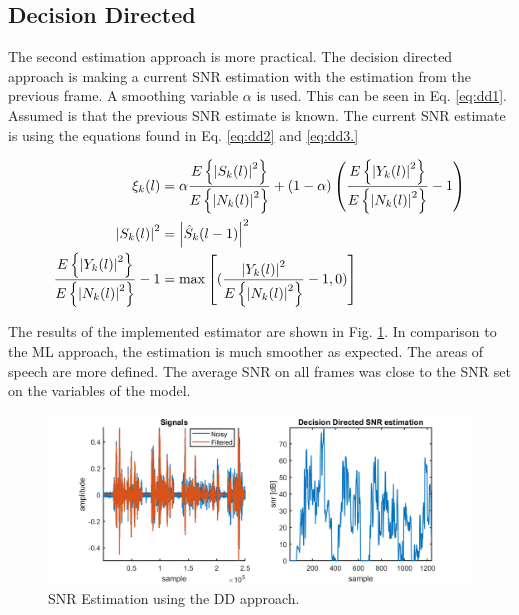 \newpage
\subsection{Decision Directed}
The second estimation approach is more practical. The decision directed approach is making a current SNR estimation with the estimation from the previous frame. A smoothing variable $\alpha$ is used. This can be seen in Eq. \ref{eq:dd1}. Assumed is that the previous SNR estimate is known. The current SNR estimate is using the equations found in Eq. \ref{eq:dd2} and \ref{eq:dd3.}


\begin{align}
  \xi_{k}(l) &= \alpha \frac{E\left\{\abs{S_{k}(l)}^{2}\right\}}{E\left\{\abs{N_{k}(l)}^{2}\right\}} +
  (1-\alpha)\left(\frac{E\left\{\abs{Y_{k}(l)}^{2}\right\}}{E\left\{\abs{N_{k}(l)}^{2}\right\}} - 1\right)
  \label{eq:dd1}\\
  \abs{S_{k}(l)}^{2} &= \abs{\hat S_{k}(l-1)}^{2}
  \label{eq:dd2} \\
  \frac{E\left\{\abs{Y_{k}(l)}^{2}\right\}}{E\left\{\abs{N_{k}(l)}^{2}\right\}} - 1 &=
  \max \left[(\frac{\abs{Y_{k}(l)}^{2}}{E\left\{\abs{N_{k}(l)}^{2}\right\}}-1,0)\right]
  \label{eq:dd3}
\end{align}

The results of the implemented estimator are shown in Fig. \ref{fig:ddsnr}. In comparison to the ML approach, the estimation is much smoother as expected. The areas of speech are more defined. The average SNR on all frames was close to the SNR set on the variables of the model.

\begin{figure}[h]
  \centering
  \includegraphics[width=\textwidth]{images/ddsnr.png}
  \caption{SNR Estimation using the DD approach.}
  \label{fig:ddsnr}
\end{figure}

